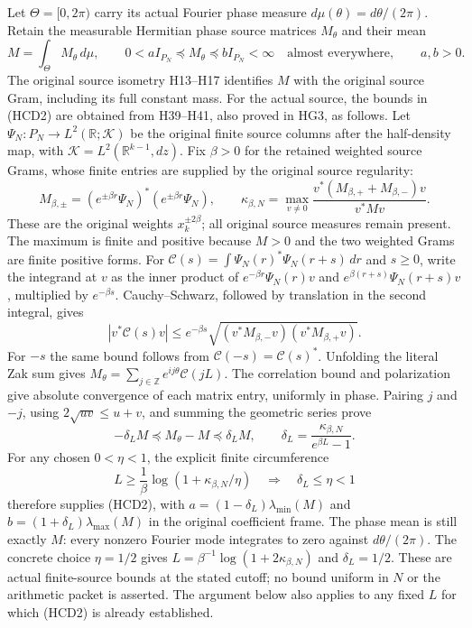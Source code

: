 \documentclass[11pt,a4paper]{article}
\theoremstyle{definition}
\providecommand{\R}{\mathbb R}
\begin{document}
Let $\Theta=[0,2\pi)$ carry its actual Fourier phase measure
$d\mu(\theta)=d\theta/(2\pi)$. Retain the measurable Hermitian
phase source matrices $M_\theta$ and their mean
\[
 M=\int_\Theta M_\theta\,d\mu,\qquad
 0<a I_{P_N}\preceq M_\theta\preceq b I_{P_N}<\infty
 \quad\text{almost everywhere},\qquad a,b>0.
 \tag{HCD2}
\]
The original source isometry H13--H17 identifies $M$ with the
original source Gram, including its full constant mass.
For the actual source, the bounds in (HCD2) are obtained from
H39--H41, also proved in HG3, as follows. Let
$\Psi_N:P_N\to L^2(\R;\mathcal K)$ be the original finite
source columns after the half-density map, with
$\mathcal K=L^2(\R^{k-1},dz)$. Fix $\beta>0$ for the retained
weighted source Grams, whose finite entries are supplied by
the original source regularity:
\[
 M_{\beta,\pm}=(e^{\pm\beta r}\Psi_N)^*
                    (e^{\pm\beta r}\Psi_N),\qquad
 \kappa_{\beta,N}=
 \max_{v\ne0}\frac{v^*(M_{\beta,+}+M_{\beta,-})v}{v^*Mv}.
 \tag{HCD2a}
\]
These are the original weights $x_k^{\pm2\beta}$; all original
source measures remain present. The maximum is finite and positive
because $M>0$ and the two weighted Grams are finite positive forms.
For $\mathcal C(s)=\int\Psi_N(r)^*\Psi_N(r+s)\,dr$ and $s\ge0$,
write the integrand at $v$ as the inner product of
$e^{-\beta r}\Psi_N(r)v$ and
$e^{\beta(r+s)}\Psi_N(r+s)v$, multiplied by $e^{-\beta s}$.
Cauchy--Schwarz, followed by translation in the second integral,
gives
\[
 |v^*\mathcal C(s)v|
 \le e^{-\beta s}
 \sqrt{(v^*M_{\beta,-}v)(v^*M_{\beta,+}v)} .
\]
For $-s$ the same bound follows from
$\mathcal C(-s)=\mathcal C(s)^*$.
Unfolding the literal Zak sum gives
$M_\theta=\sum_{j\in\mathbb Z}e^{ij\theta}\mathcal C(jL)$.
The correlation bound and polarization give absolute convergence
of each matrix entry, uniformly in phase. Pairing $j$ and $-j$,
using $2\sqrt{uv}\le u+v$, and summing the geometric series prove
\[
 -\delta_LM\preceq M_\theta-M\preceq\delta_LM,\qquad
 \delta_L=\frac{\kappa_{\beta,N}}{e^{\beta L}-1}.
 \tag{HCD2b}
\]
For any chosen $0<\eta<1$, the explicit finite circumference
\[
 L\ge\frac1\beta\log(1+\kappa_{\beta,N}/\eta)
 \quad\Longrightarrow\quad
 \delta_L\le\eta<1
 \tag{HCD2c}
\]
therefore supplies (HCD2), with
$a=(1-\delta_L)\lambda_{\min}(M)$ and
$b=(1+\delta_L)\lambda_{\max}(M)$ in the original coefficient
frame. The phase mean is still exactly $M$: every nonzero
Fourier mode integrates to zero against $d\theta/(2\pi)$.
The concrete choice $\eta=1/2$ gives
$L=\beta^{-1}\log(1+2\kappa_{\beta,N})$ and $\delta_L=1/2$.
These are actual finite-source bounds at the stated cutoff;
no bound uniform in $N$ or the arithmetic packet is asserted.
The argument below also applies to any fixed $L$ for which
(HCD2) is already established.
\end{document}

